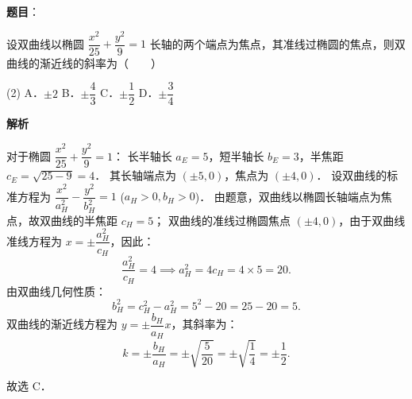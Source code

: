 \begin{answer}

\textbf{题目}：

设双曲线以椭圆 $\dfrac{x^2}{25} + \dfrac{y^2}{9} = 1$ 长轴的两个端点为焦点，其准线过椭圆的焦点，则双曲线的渐近线的斜率为\mbox{（　　）}

\begin{gkopts}(2)
\task A．$\pm 2$
\task B．$\pm \dfrac{4}{3}$
\task C．$\pm \dfrac{1}{2}$
\task D．$\pm \dfrac{3}{4}$
\end{gkopts}

\textbf{解析}

对于椭圆 $\dfrac{x^2}{25} + \dfrac{y^2}{9} = 1$：
长半轴长 $a_E = 5$，短半轴长 $b_E = 3$，半焦距 $c_E = \sqrt{25 - 9} = 4$．
其长轴端点为 $(\pm 5, 0)$，焦点为 $(\pm 4, 0)$．
设双曲线的标准方程为 $\dfrac{x^2}{a_H^2} - \dfrac{y^2}{b_H^2} = 1$ ($a_H > 0, b_H > 0$)．
由题意，双曲线以椭圆长轴端点为焦点，故双曲线的半焦距 $c_H = 5$；
双曲线的准线过椭圆焦点 $(\pm 4, 0)$，由于双曲线准线方程为 $x = \pm \dfrac{a_H^2}{c_H}$，因此：
\nopagebreak[4]
\[
\dfrac{a_H^2}{c_H} = 4 \implies a_H^2 = 4 c_H = 4 \times 5 = 20.
\]
由双曲线几何性质：
\nopagebreak[4]
\[
b_H^2 = c_H^2 - a_H^2 = 5^2 - 20 = 25 - 20 = 5.
\]
双曲线的渐近线方程为 $y = \pm \dfrac{b_H}{a_H} x$，其斜率为：
\nopagebreak[4]
\[
k = \pm \dfrac{b_H}{a_H} = \pm \sqrt{\dfrac{5}{20}} = \pm \sqrt{\dfrac{1}{4}} = \pm \dfrac{1}{2}.
\]

故选 C．


\end{answer}
